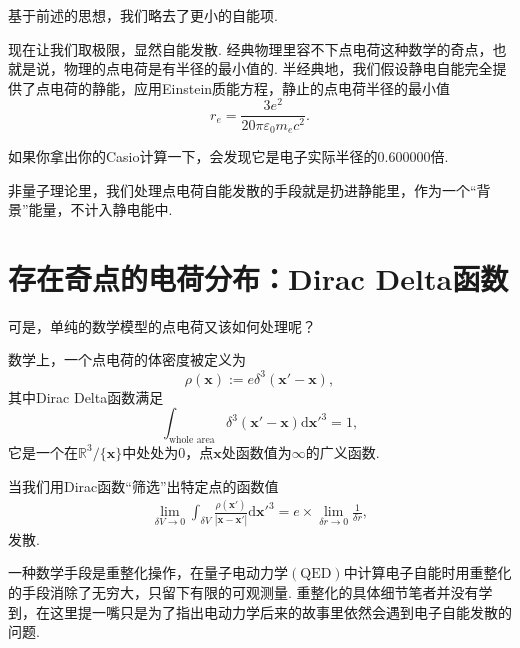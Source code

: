 \documentclass[12pt]{article}
\newcommand{\de}[1]{\mathrm{d}#1}
\newcommand{\mrm}[1]{\mathrm{#1}}
\newcommand{\mbf}[1]{\mathbf{#1}}
\newcommand{\kh}[1]{\left(#1\right)}
\begin{document}
基于前述的思想，我们略去了更小的自能项.

现在让我们取极限，显然自能发散. 经典物理里容不下点电荷这种数学的奇点，也就是说，物理的点电荷是有半径的最小值的. 半经典地，我们假设静电自能完全提供了点电荷的静能，应用Einstein质能方程，静止的点电荷半径的最小值
\[r_e=\frac{3e^2}{20\pi \varepsilon_0m_ec^2}.\]

如果你拿出你的Casio计算一下，会发现它是电子实际半径的\(0.600000\)倍.

非量子理论里，我们处理点电荷自能发散的手段就是扔进静能里，作为一个“背景”能量，不计入静电能中.
\section{存在奇点的电荷分布：Dirac Delta函数}
可是，单纯的数学模型的点电荷又该如何处理呢？

数学上，一个点电荷的体密度被定义为
\[\rho\kh{\mbf x}:=e\delta^3\kh{\mbf x'-\mbf x},\]
其中Dirac Delta函数满足
\[\int_{\text{whole area}}\delta^3 \kh{\mbf x'-\mbf x}\de {\mbf x'}^3=1,\]
它是一个在\(\mathbb{R}^3/{\{\mbf x\}}\)中处处为\(0\)，点\(\mbf x\)处函数值为\(\infty\)的广义函数.

当我们用Dirac函数“筛选”出特定点的函数值
\begin{align*}
    \lim_{\delta V \to 0}\int_{\delta V}\frac{\rho \kh{\mbf x'}}{|\mbf x - \mbf x'|} \de {\mbf x'}^3=e\times\lim_{\delta r\to0}\frac{1}{\delta r},
\end{align*}
发散.

一种数学手段是重整化操作，在量子电动力学\(\kh{\mrm{QED}}\)中计算电子自能时用重整化的手段消除了无穷大，只留下有限的可观测量. 重整化的具体细节笔者并没有学到，在这里提一嘴只是为了指出电动力学后来的故事里依然会遇到电子自能发散的问题.
\end{document}
